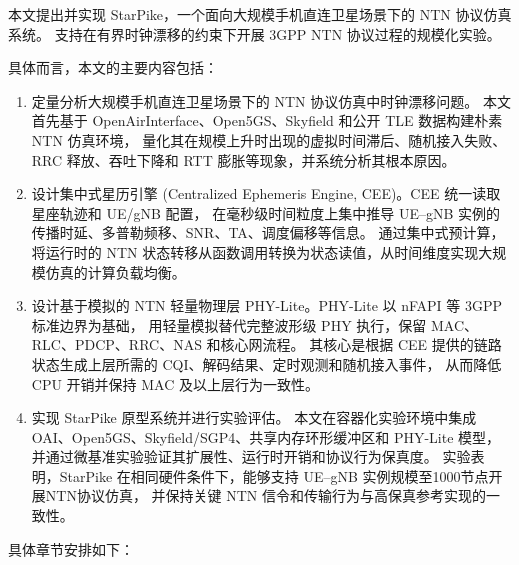 
本文提出并实现 StarPike，一个面向大规模手机直连卫星场景下的 NTN 协议仿真系统。
支持在有界时钟漂移的约束下开展 3GPP NTN 协议过程的规模化实验。

具体而言，本文的主要内容包括：
\begin{enumerate}[wide, label=\arabic*),  labelindent=21pt]
    \item 定量分析大规模手机直连卫星场景下的 NTN 协议仿真中时钟漂移问题。
    本文首先基于 OpenAirInterface、Open5GS、Skyfield 和公开 TLE 数据构建朴素 NTN 仿真环境，
    量化其在规模上升时出现的虚拟时间滞后、随机接入失败、RRC 释放、吞吐下降和 RTT 膨胀等现象，并系统分析其根本原因。
    \item 设计集中式星历引擎 (Centralized Ephemeris Engine, CEE)。CEE 统一读取星座轨迹和 UE/gNB 配置，
    在毫秒级时间粒度上集中推导 UE--gNB 实例的传播时延、多普勒频移、SNR、TA、调度偏移等信息。
    通过集中式预计算，将运行时的 NTN 状态转移从函数调用转换为状态读值，从时间维度实现大规模仿真的计算负载均衡。
    \item 设计基于模拟的 NTN 轻量物理层 PHY-Lite。PHY-Lite 以 nFAPI 等 3GPP 标准边界为基础，
    用轻量模拟替代完整波形级 PHY 执行，保留 MAC、RLC、PDCP、RRC、NAS 和核心网流程。
    其核心是根据 CEE 提供的链路状态生成上层所需的 CQI、解码结果、定时观测和随机接入事件，
    从而降低 CPU 开销并保持 MAC 及以上层行为一致性。
    \item 实现 StarPike 原型系统并进行实验评估。
    本文在容器化实验环境中集成 OAI、Open5GS、Skyfield/SGP4、共享内存环形缓冲区和 PHY-Lite 模型，
    并通过微基准实验验证其扩展性、运行时开销和协议行为保真度。
    实验表明，StarPike 在相同硬件条件下，能够支持 UE--gNB 实例规模至1000节点开展NTN协议仿真，
    并保持关键 NTN 信令和传输行为与高保真参考实现的一致性。
\end{enumerate}


具体章节安排如下：

